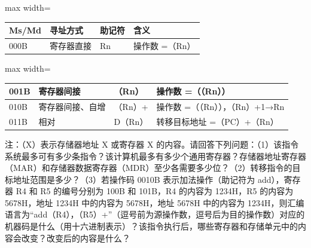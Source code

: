\documentclass[UTF8,11pt]{ctexart}
\begin{document}
\begin{center}\begin{adjustbox}{max width=\linewidth}\begin{tabular}{|>{\raggedright\arraybackslash}p{\dimexpr(\linewidth-8\tabcolsep-5\arrayrulewidth)/4\relax}|>{\raggedright\arraybackslash}p{\dimexpr(\linewidth-8\tabcolsep-5\arrayrulewidth)/4\relax}|>{\raggedright\arraybackslash}p{\dimexpr(\linewidth-8\tabcolsep-5\arrayrulewidth)/4\relax}|>{\raggedright\arraybackslash}p{\dimexpr(\linewidth-8\tabcolsep-5\arrayrulewidth)/4\relax}|}\hline
Ms/Md & 寻址方式 & 助记符 & 含义\\\hline
000B & 寄存器直接 & Rn & 操作数 =（Rn）\\\hline\end{tabular}\end{adjustbox}\end{center}

\begin{center}\begin{adjustbox}{max width=\linewidth}\begin{tabular}{|>{\raggedright\arraybackslash}p{\dimexpr(\linewidth-8\tabcolsep-5\arrayrulewidth)/4\relax}|>{\raggedright\arraybackslash}p{\dimexpr(\linewidth-8\tabcolsep-5\arrayrulewidth)/4\relax}|>{\raggedright\arraybackslash}p{\dimexpr(\linewidth-8\tabcolsep-5\arrayrulewidth)/4\relax}|>{\raggedright\arraybackslash}p{\dimexpr(\linewidth-8\tabcolsep-5\arrayrulewidth)/4\relax}|}\hline
001B & 寄存器间接 & （Rn） & 操作数 =（（Rn））\\\hline
010B & 寄存器间接、自增 & （Rn）+ & 操作数 =（（Rn）），（Rn）+1→Rn\\\hline
011B & 相对 & D（Rn） & 转移目标地址 =（PC）+（Rn）\\\hline\end{tabular}\end{adjustbox}\end{center}

注：（X）表示存储器地址 X 或寄存器 X 的内容。请回答下列问题：（1）该指令系统最多可有多少条指令？该计算机最多有多少个通用寄存器？存储器地址寄存器（MAR）和存储器数据寄存器（MDR）至少各需要多少位？（2）转移指令的目标地址范围是多少？（3）若操作码 0010B 表示加法操作（助记符为 add），寄存器 R4 和 R5 的编号分别为 100B 和 101B，R4 的内容为 1234H，R5 的内容为 5678H，地址 1234H 中的内容为 5678H，地址 5678H 中的内容为 1234H，则汇编语言为“add（R4），（R5）+”（逗号前为源操作数，逗号后为目的操作数）对应的机器码是什么（用十六进制表示）？该指令执行后，哪些寄存器和存储单元中的内容会改变？改变后的内容是什么？
\end{document}
